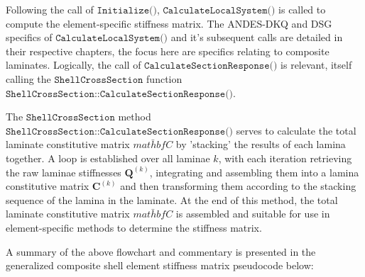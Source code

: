 Following the call of $\texttt{Initialize()}$, $\texttt{CalculateLocalSystem()}$ is called to compute the element-specific stiffness matrix. The ANDES-DKQ and DSG specifics of $\texttt{CalculateLocalSystem()}$ and it's subsequent calls are detailed in their respective chapters, the focus here are specifics relating to composite laminates. Logically, the call of $\texttt{CalculateSectionResponse()}$ is relevant, itself calling the $\texttt{ShellCrossSection}$ function $\texttt{ShellCrossSection::CalculateSectionResponse()}$.

The $\texttt{ShellCrossSection}$ method $\texttt{ShellCrossSection::CalculateSectionResponse()}$ serves to calculate the total laminate constitutive matrix $\bar{mathbf{C}}$ by 'stacking' the results of each lamina together. A loop is established over all laminae $k$, with each iteration retrieving the raw laminae stiffnesses $\mathbf{Q}^{(k)}$, integrating and assembling them into a lamina constitutive matrix $\mathbf{C}^{(k)}$ and then transforming them according to the stacking sequence of the lamina in the laminate. At the end of this method, the total laminate constitutive matrix $\bar{mathbf{C}}$ is assembled and suitable for use in element-specific methods to determine the stiffness matrix. 

A summary of the above flowchart and commentary is presented in the generalized composite shell element stiffness matrix pseudocode below:

